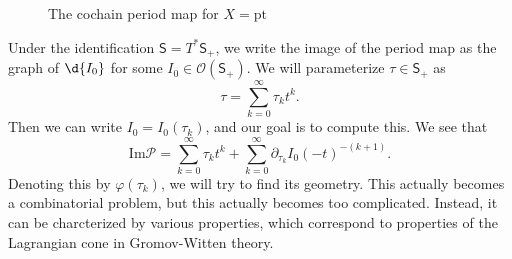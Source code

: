 \documentclass{amsart}
\theoremstyle{definition}
\theoremstyle{remark}
\theoremstyle{plain}
\theoremstyle{definition}
\theoremstyle{remark}
\newcommand{\Ima}{\mathrm{Im}}
\newcommand{\C}{\mathbb{C}}
\newcommand{\mc}[1]{\mathcal{#1}}
\newcommand{\mr}[1]{\mathrm{#1}}
\newcommand{\ms}[1]{\mathsf{#1}}
\newcommand{\1}{\mathbf{1}}
\newcommand{\2}{\mathbf{2}}
\newcommand{\3}{\mathbf{3}}
\newcommand{\ps}[1]{\lBrack #1 \rBrack}
\begin{document}
\begin{figure}[htpb]
\begin{center}
\end{center}
\caption{The cochain period map for \(X = \mr{pt}\)}%
\label{fig:cochain-period-map-point}
\end{figure}

Under the identification \(\ms{S} = T^* \ms{S}_+\), we write the image of the period map as the graph of \(\d{I_0}\) for some \(I_0 \in \mc{O}(\ms{S}_+)\). We will parameterize \(\tau \in \ms{S}_+\) as
\[ \tau = \sum_{k = 0}^{\infty} \tau_k t^k. \]
Then we can write \(I_0 = I_0(\tau_k)\), and our goal is to compute this. We see that
\[ \Ima\mc{P} = \sum_{k = 0}^{\infty} \tau_k t^k + \sum_{k = 0}^{\infty} \partial_{\tau_k}  I_0 (-t)^{-(k+1)}. \]
Denoting this by \(\varphi(\tau_k)\), we will try to find its geometry. This actually becomes a combinatorial problem, but this actually becomes too complicated. Instead, it can be charcterized by various properties, which correspond to properties of the Lagrangian cone in Gromov-Witten theory.
\end{document}
